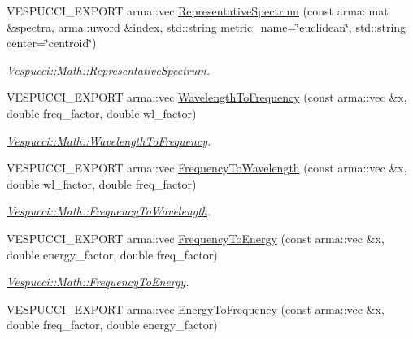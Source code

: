 \begin{DoxyCompactItemize}
V\+E\+S\+P\+U\+C\+C\+I\+\_\+\+E\+X\+P\+O\+RT arma\+::vec \hyperlink{namespace_vespucci_1_1_math_a593d18ef26411813957a0aaa28a386a0}{Representative\+Spectrum} (const arma\+::mat \&spectra, arma\+::uword \&index, std\+::string metric\+\_\+name=\char`\"{}euclidean\char`\"{}, std\+::string center=\char`\"{}centroid\char`\"{})
\begin{DoxyCompactList}\small\item\em \hyperlink{namespace_vespucci_1_1_math_a593d18ef26411813957a0aaa28a386a0}{Vespucci\+::\+Math\+::\+Representative\+Spectrum}. \end{DoxyCompactList}\item 
V\+E\+S\+P\+U\+C\+C\+I\+\_\+\+E\+X\+P\+O\+RT arma\+::vec \hyperlink{namespace_vespucci_1_1_math_a84c8111bfa4935afc7551747ecd5bb23}{Wavelength\+To\+Frequency} (const arma\+::vec \&x, double freq\+\_\+factor, double wl\+\_\+factor)
\begin{DoxyCompactList}\small\item\em \hyperlink{namespace_vespucci_1_1_math_a84c8111bfa4935afc7551747ecd5bb23}{Vespucci\+::\+Math\+::\+Wavelength\+To\+Frequency}. \end{DoxyCompactList}\item 
V\+E\+S\+P\+U\+C\+C\+I\+\_\+\+E\+X\+P\+O\+RT arma\+::vec \hyperlink{namespace_vespucci_1_1_math_a5a37b48ff133c76f7144b34dc385b5ba}{Frequency\+To\+Wavelength} (const arma\+::vec \&x, double wl\+\_\+factor, double freq\+\_\+factor)
\begin{DoxyCompactList}\small\item\em \hyperlink{namespace_vespucci_1_1_math_a5a37b48ff133c76f7144b34dc385b5ba}{Vespucci\+::\+Math\+::\+Frequency\+To\+Wavelength}. \end{DoxyCompactList}\item 
V\+E\+S\+P\+U\+C\+C\+I\+\_\+\+E\+X\+P\+O\+RT arma\+::vec \hyperlink{namespace_vespucci_1_1_math_ad6a04b1f75540524f59f68ba859656e6}{Frequency\+To\+Energy} (const arma\+::vec \&x, double energy\+\_\+factor, double freq\+\_\+factor)
\begin{DoxyCompactList}\small\item\em \hyperlink{namespace_vespucci_1_1_math_ad6a04b1f75540524f59f68ba859656e6}{Vespucci\+::\+Math\+::\+Frequency\+To\+Energy}. \end{DoxyCompactList}\item 
V\+E\+S\+P\+U\+C\+C\+I\+\_\+\+E\+X\+P\+O\+RT arma\+::vec \hyperlink{namespace_vespucci_1_1_math_a0edab1a9ba195597f85b664d6b405132}{Energy\+To\+Frequency} (const arma\+::vec \&x, double freq\+\_\+factor, double energy\+\_\+factor)

\end{DoxyCompactItemize}
